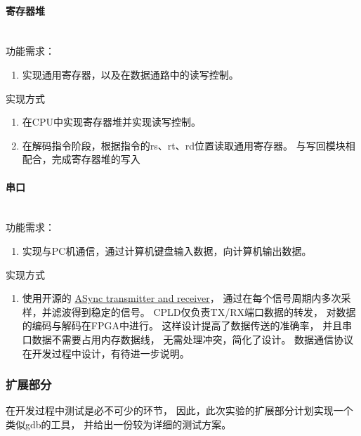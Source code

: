             \paragraph{寄存器堆}
                \mbox{} \\ 

                功能需求：
                \begin{enumerate}
                \item
                实现通用寄存器，以及在数据通路中的读写控制。
                \end{enumerate}

                实现方式
                \begin{enumerate}
                \item
                在CPU中实现寄存器堆并实现读写控制。
                \item
                在解码指令阶段，根据指令的rs、rt、rd位置读取通用寄存器。
                与写回模块相配合，完成寄存器堆的写入
                \end{enumerate}

            \paragraph{串口}
                \mbox{} \\

                功能需求：
                \begin{enumerate}
                \item
                实现与PC机通信，通过计算机键盘输入数据，向计算机输出数据。
                \end{enumerate}

                实现方式
                \begin{enumerate}
                \item
                使用开源的%
                \href{http://www.fpga4fun.com/SerialInterface.html}{ASync transmitter and receiver}，%
                通过在每个信号周期内多次采样，并滤波得到稳定的信号。%
                CPLD仅负责TX/RX端口数据的转发，%
                对数据的编码与解码在FPGA中进行。%
                这样设计提高了数据传送的准确率，%
                并且串口数据不需要占用内存数据线，%
                无需处理冲突，简化了设计。%
                数据通信协议在开发过程中设计，有待进一步说明。

                \end{enumerate}
        \subsubsection{扩展部分}
            在开发过程中测试是必不可少的环节，%
            因此，此次实验的扩展部分计划实现一个类似gdb的工具，%
            并给出一份较为详细的测试方案。

